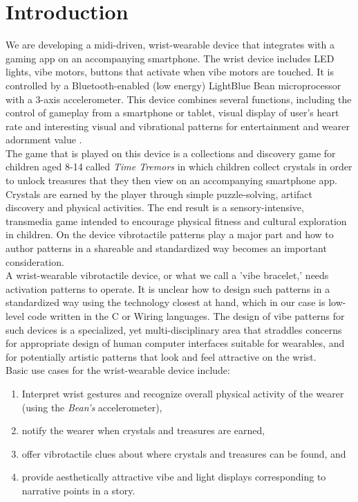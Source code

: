 \documentclass[a4paper, twocolumn]{article}
\begin{document}
\section{Introduction}

We are developing a midi-driven, wrist-wearable device that integrates with a gaming app on an accompanying smartphone. The wrist device includes LED lights, vibe motors, buttons that activate when vibe motors are touched. It is controlled by a Bluetooth-enabled (low energy) LightBlue Bean microprocessor with a 3-axis accelerometer. This device combines several functions, including the control of gameplay from a smartphone or tablet, visual display of user's heart rate and interesting visual and vibrational patterns for entertainment and wearer adornment value \cite{tindale2014wearable}.\\

The game that is played on this device is a collections and discovery game for children aged 8-14 called \textit{Time Tremors} in which children collect crystals in order to unlock treasures that they then view on an accompanying smartphone app. Crystals are earned by the player through simple puzzle-solving, artifact discovery and physical activities. The end result is a sensory-intensive, transmedia game intended to encourage physical fitness and cultural exploration in children. On the device vibrotactile patterns play a major part and how to author patterns in a shareable and standardized way becomes an important consideration.\\

A wrist-wearable vibrotactile device, or what we call a 'vibe bracelet,' needs activation patterns to operate. It is unclear how to design such patterns in a standardized way using the technology closest at hand, which in our case is low-level code written in the C or Wiring languages. The design of vibe patterns for such devices is a specialized, yet multi-disciplinary area that straddles concerns for appropriate design of human computer interfaces suitable for wearables, and for potentially artistic patterns that look and feel attractive on the wrist.\\

Basic use cases for the wrist-wearable device include:
\begin{enumerate}
  \item Interpret wrist gestures and recognize overall physical activity of the wearer (using the \textit{Bean's} accelerometer),
  \item notify the wearer when crystals and treasures are earned,
  \item offer vibrotactile clues about where crystals and treasures can be found, and
  \item provide aesthetically attractive vibe and light displays corresponding to narrative points in a story.\\
\end{enumerate}
\end{document}
